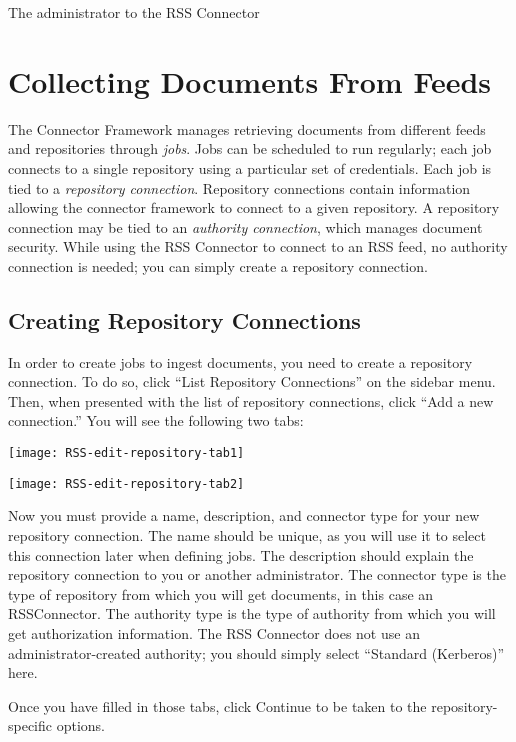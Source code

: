\begin{changemargin}{1.5in}{0in}
The administrator to the RSS Connector 


\section{Collecting Documents From Feeds} %

The Connector Framework manages retrieving documents from different
feeds and repositories through \emph{jobs}. Jobs can be scheduled to run
regularly; each job connects to a single repository using a particular
set of credentials. Each job is tied to a \emph{repository
connection}. Repository connections contain information allowing the
connector framework to connect to a given repository. A repository
connection may be tied to an \emph{authority connection}, which
manages document security. While using the RSS Connector to connect
to an RSS feed, no authority connection is needed; you can simply
create a repository connection.


\subsection{Creating Repository Connections}

In order to create jobs to ingest documents, you need to create a
repository connection. To do so, click ``List Repository
Connections'' on the sidebar menu. Then, when presented with the list
of repository connections, click ``Add a new connection.'' You will
see the following two tabs:





\texttt{[image: RSS-edit-repository-tab1]}

\texttt{[image: RSS-edit-repository-tab2]}

Now you must provide a name, description, and connector type for your
new repository connection. The name should be unique, as you will use
it to select this connection later when defining jobs. The description
should explain the repository connection to you or another
administrator.  The connector type is the type of repository from
which you will get documents, in this case an RSSConnector. The
authority type is the type of authority from which you will get
authorization information. The RSS Connector does not use an
administrator-created authority; you should simply select ``Standard
(Kerberos)'' here.

Once you have filled in those tabs, click Continue to be taken to the
repository-specific options.


\end{changemargin}
